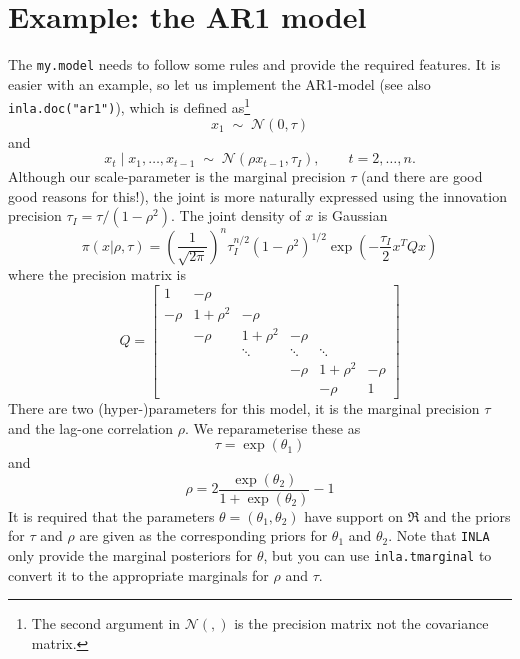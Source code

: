 \documentclass[a4paper,11pt]{article}
\begin{document}
\section*{Example: the AR1 model}

The \texttt{my.model} needs to follow some rules and provide the
required features. It is easier with an example, so let us implement
the AR1-model (see also \texttt{inla.doc("ar1")}), which is defined
as\footnote{The second argument in ${\mathcal N}(,)$ is the precision
    matrix not the covariance matrix.}
\begin{displaymath}
    x_{1} \;\sim\; {\mathcal N}(0, \tau)
\end{displaymath}
and
\begin{displaymath}
    x_{t} \mid x_{1}, \ldots, x_{t-1} \;\sim\; {\mathcal N}(\rho
    x_{t-1}, \tau_{I}), \qquad t=2, \ldots,n.
\end{displaymath}
Although our scale-parameter is the marginal precision $\tau$ (and
there are good good reasons for this!), the joint is more naturally
expressed using the innovation precision $\tau_{I} =
\tau/(1-\rho^{2})$. The joint density of $x$ is Gaussian
\begin{displaymath}
    \pi(x|\rho,\tau) = \left(\frac{1}{\sqrt{2\pi}}\right)^{n}
    \tau_{I}^{n/2} (1-\rho^{2})^{1/2}
    \exp\left(-\frac{\tau_{I}}{2} x^{T} Q x\right)
\end{displaymath}
where the precision matrix is
\begin{displaymath}
    Q =
    \begin{bmatrix}
        1 & -\rho &&&& \\
        -\rho & 1+\rho^{2}& -\rho &&& \\
        &-\rho & 1+\rho^{2}& -\rho && \\
        && \ddots& \ddots& \ddots& \\
        &       &       &       -\rho & 1 + \rho^{2} & -\rho\\
        &       &       &       & -\rho & 1
    \end{bmatrix}
\end{displaymath}
There are two (hyper-)parameters for this model, it is the marginal
precision $\tau$ and the lag-one correlation $\rho$.  We
reparameterise these as
\begin{displaymath}
    \tau = \exp(\theta_1) 
\end{displaymath}
and
\begin{displaymath}
    \rho = 2\frac{\exp(\theta_{2})}{1+\exp(\theta_{2})} - 1
\end{displaymath}
It is required that the parameters $\theta = (\theta_{1}, \theta_{2})$
have support on $\Re$ and the priors for $\tau$ and $\rho$ are given
as the corresponding priors for $\theta_{1}$ and $\theta_{2}$. Note
that \texttt{INLA} only provide the marginal posteriors for $\theta$,
but you can use \texttt{inla.tmarginal} to convert it to the
appropriate marginals for $\rho$ and $\tau$.
\end{document}
